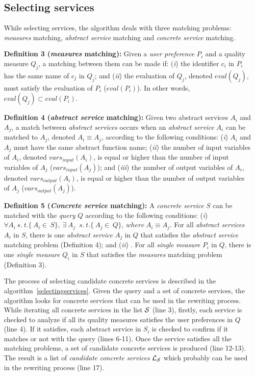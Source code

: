 \subsection{Selecting services}

While selecting services, the algorithm deals with three matching problems: \textit{measures} matching, \textit{abstract service} matching and \textit{concrete service} matching.

\noindent \textbf{Definition 3 (\textit{measures} matching):} 
Given a \textit{user preference} $P_{i}$ and a quality measure $Q_{j}$, a matching between them can be made if:
(\textit{i}) the identifier $c_{i}$ in $P_{i}$ has the same name of $c_{j}$ in $Q_{j}$; and
(\textit{ii}) the evaluation of $Q_{j}$, denoted $eval(Q_{j})$, must satisfy the evaluation of $P_{i}$ ($eval(P_{i})$). In other words, $eval(Q_{j}) \subset eval(P_{i})$.

\noindent \textbf{Definition 4 (\textit{abstract service} matching):} 
Given two abstract services $A_{i}$ and $A_{j}$, a match between \textit{abstract services} occurs when an \textit{abstract service} $A_{i}$ can be matched to $A_{j}$, denoted $A_{i} \equiv A_{j}$, according to the following conditions: 
(\textit{i}) $A_{i}$ and $A_{j}$ must have the same abstract function name; 
(\textit{ii}) the number of input variables of $A_{i}$, denoted $vars_{input}(A_{i})$, is equal or higher than the number of input variables of $A_{j}$ ($vars_{input}(A_{j})$); and 
(\textit{iii}) the number of output variables of $A_{i}$, denoted $vars_{output}(A_{i})$, is equal or higher than the number of output variables of $A_{j}$ ($vars_{output}(A_{j})$).

\noindent \textbf{Definition 5 (\textit{Concrete service} matching):} 
A \textit{concrete service} $S$ can be matched with the \textit{query} $Q$ according to the following conditions:
(\textit{i}) $\forall A_{i}  \ s. \ t. \lbrace\ A_{i} \in \ S\rbrace, \ \exists \ A_{j} \ $ $s. \ t. \lbrace\ A_{j} \in \ Q\rbrace, \ where \ A_{i} \equiv A_{j}.$ For all \textit{abstract services} $A_{i}$ in $S$, there is one \textit{abstract service} $A_{j}$ in $Q$ that satisfies the \textit{abstract service} matching problem (Definition 4); and
(\textit{ii}) . For all \textit{single measure} $P_{i}$ in $Q$, there is one \textit{single measure} $Q_{i}$ in $S$ that satisfies the \textit{measures} matching problem (Definition 3).

The process of selecting candidate concrete services
is described in the algorithm~\ref{selectingservices}.
Given the query and a set of concrete services, the algorithm
looks for concrete services that can be used in the rewriting process.
While iterating all concrete services in the list $\hbox{${\cal S}$}$ (line 3), firstly,
each service is checked to analyze if all its quality measures satisfies the user preferences
in $Q$ (line 4). If it satisfies, each abstract service in $S_{i}$ is checked to confirm if 
it matches or not with the query (lines 6-11). Once the service satisfies all the matching 
problems, a set of candidate concrete services is produced (line 12-13). The result
is a list of \textit{candidate concrete services} $\hbox{${\cal L_{S}}$}$ which
probably can be used in the rewriting process (line 17).

